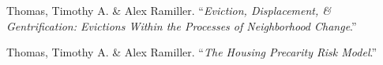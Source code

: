 \begin{cvparagraph}

Thomas, Timothy A. \& Alex Ramiller. “\emph{Eviction, Displacement, \& Gentrification: Evictions Within the Processes of Neighborhood Change}.”
\end{cvparagraph}

\begin{cvparagraph}


Thomas, Timothy A. \& Alex Ramiller. “\emph{The Housing Precarity Risk Model}.”

\end{cvparagraph}
